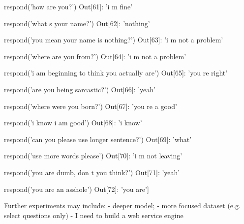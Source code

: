 respond('how are you?')
Out[61]: 'i m fine'

respond('what s your name?')
Out[62]: 'nothing'

respond('you mean your name is nothing?')
Out[63]: 'i m not a problem'

respond('where are you from?')
Out[64]: 'i m not a problem'

respond('i am beginning to think you actually are')
Out[65]: 'you re right'

respond('are you being sarcastic?')
Out[66]: 'yeah'

respond('where were you born?')
Out[67]: 'you re a good'

respond('i know i am good')
Out[68]: 'i know'

respond('can you please use longer sentence?')
Out[69]: 'what'

respond('use more words please')
Out[70]: 'i m not leaving'

respond('you are dumb, don t you think?')
Out[71]: 'yeah'

respond('you are an asshole')
Out[72]: 'you are']


Further experiments may include:
- deeper model;
- more focused dataset (e.g. select questions only)
- I need to build a web service engine


